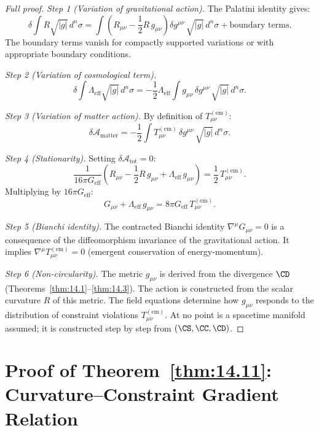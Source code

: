 \begin{proof}[Full proof]
\emph{Step 1 (Variation of gravitational action).}
The Palatini identity gives:
\[
  \delta \int R\sqrt{|g|}\,d^n\sigma
  = \int \left(R_{\mu\nu} - \frac{1}{2}R\,g_{\mu\nu}\right)
    \delta g^{\mu\nu}\,\sqrt{|g|}\,d^n\sigma
  + \text{boundary terms}.
\]
The boundary terms vanish for compactly supported variations
or with appropriate boundary conditions.

\emph{Step 2 (Variation of cosmological term).}
\[
  \delta \int \Lambda_{\mathrm{eff}}\sqrt{|g|}\,d^n\sigma
  = -\frac{1}{2}\Lambda_{\mathrm{eff}}
    \int g_{\mu\nu}\,\delta g^{\mu\nu}\,\sqrt{|g|}\,d^n\sigma.
\]

\emph{Step 3 (Variation of matter action).}
By definition of $T_{\mu\nu}^{(\mathrm{em})}$:
\[
  \delta \mathcal{A}_{\mathrm{matter}}
  = -\frac{1}{2}\int T_{\mu\nu}^{(\mathrm{em})}\,
    \delta g^{\mu\nu}\,\sqrt{|g|}\,d^n\sigma.
\]

\emph{Step 4 (Stationarity).}
Setting $\delta\mathcal{A}_{\mathrm{tot}} = 0$:
\[
  \frac{1}{16\pi G_{\mathrm{eff}}}
  \left(R_{\mu\nu} - \frac{1}{2}R\,g_{\mu\nu}
  + \Lambda_{\mathrm{eff}}\,g_{\mu\nu}\right)
  = \frac{1}{2}\,T_{\mu\nu}^{(\mathrm{em})}.
\]
Multiplying by $16\pi G_{\mathrm{eff}}$:
\[
  G_{\mu\nu} + \Lambda_{\mathrm{eff}}\,g_{\mu\nu}
  = 8\pi G_{\mathrm{eff}}\,T_{\mu\nu}^{(\mathrm{em})}.
\]

\emph{Step 5 (Bianchi identity).}
The contracted Bianchi identity $\nabla^\mu G_{\mu\nu} = 0$ is a
consequence of the diffeomorphism invariance of the gravitational
action.  It implies $\nabla^\mu T_{\mu\nu}^{(\mathrm{em})} = 0$
(emergent conservation of energy-momentum).

\emph{Step 6 (Non-circularity).}
The metric $g_{\mu\nu}$ is derived from the divergence $\CD$
(Theorems~\ref{thm:14.1}--\ref{thm:14.3}).  The action is
constructed from the scalar curvature $R$ of this metric.  The
field equations determine how $g_{\mu\nu}$ responds to the
distribution of constraint violations $T_{\mu\nu}^{(\mathrm{em})}$.
At no point is a spacetime manifold assumed; it is constructed
step by step from $(\CS, \CC, \CD)$.
\end{proof}

\section{Proof of Theorem~\ref{thm:14.11}: Curvature--Constraint
  Gradient Relation}
\label{app:pf-curv-constraint}


